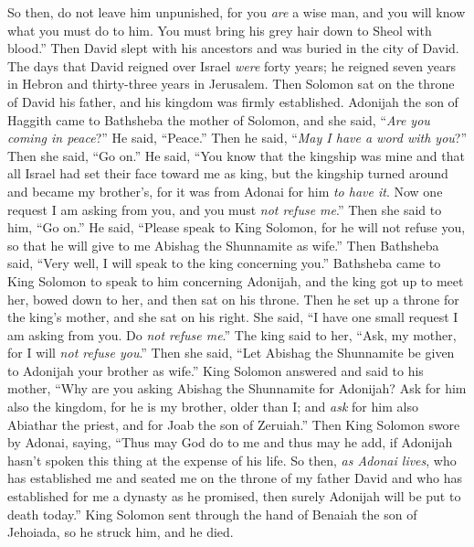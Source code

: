 \begin{biblechapter}
\verse So then, do not leave him unpunished, for you \textit{are} a wise man, and you will know what you must do to him. You must bring his grey hair down to Sheol with blood.”
\verse Then David slept with his ancestors and was buried in the city of David.
\verse The days that David reigned over Israel \textit{were} forty years; he reigned seven years in Hebron and thirty-three years in Jerusalem.
\verse Then Solomon sat on the throne of David his father, and his kingdom was firmly established.
 Adonijah the son of Haggith came to Bathsheba the mother of Solomon, and she said, “\textit{Are you coming in peace}?” He said, “Peace.”
\verse Then he said, “\textit{May I have a word with you}?” Then she said, “Go on.”
\verse He said, “You know that the kingship was mine and that all Israel had set their face toward me as king, but the kingship turned around and became my brother’s, for it was from Adonai for him \textit{to have it}.
\verse Now one request I am asking from you, and you must \textit{not refuse me}.” Then she said to him, “Go on.”
\verse He said, “Please speak to King Solomon, for he will not refuse you, so that he will give to me Abishag the Shunnamite as wife.”
\verse Then Bathsheba said, “Very well, I will speak to the king concerning you.”
 Bathsheba came to King Solomon to speak to him concerning Adonijah, and the king got up to meet her, bowed down to her, and then sat on his throne. Then he set up a throne for the king’s mother, and she sat on his right.
\verse She said, “I have one small request I am asking from you. Do \textit{not refuse me}.” The king said to her, “Ask, my mother, for I will \textit{not refuse you}.”
\verse Then she said, “Let Abishag the Shunnamite be given to Adonijah your brother as wife.”
\verse King Solomon answered and said to his mother, “Why are you asking Abishag the Shunnamite for Adonijah? Ask for him also the kingdom, for he is my brother, older than I; and \textit{ask} for him also Abiathar the priest, and for Joab the son of Zeruiah.”
\verse Then King Solomon swore by Adonai, saying, “Thus may God do to me and thus may he add, if Adonijah hasn’t spoken this thing at the expense of his life.
\verse So then, \textit{as Adonai lives}, who has established me and seated me on the throne of my father David and who has established for me a dynasty as he promised, then surely Adonijah will be put to death today.”
\verse King Solomon sent through the hand of Benaiah the son of Jehoiada, so he struck him, and he died.

\end{biblechapter}
